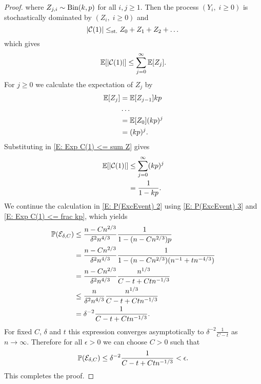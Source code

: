 \begin{proof}
	where $Z_{j,i} \sim\operatorname*{Bin}(k,p)$ for all $i,j \geq 1$.
	Then the process $(Y_i, \; i\geq 0)$ is stochastically dominated by 
	$(Z_i, \; i\geq 0)$ and
	\begin{equation}
	|\mathcal{C}(1)| \leq_{\text{st.}} Z_0 + Z_1 + Z_2 + \dots
	\end{equation}
	which gives
	\begin{equation} \label{E: Exp C(1) <= sum Z}
		\mathbb{E}[|\mathcal{C}(1)|] \leq \sum_{j=0}^{\infty}\mathbb{E}[Z_j].
	\end{equation}	
	For $j\geq0$ we calculate the expectation of $Z_j$ by
	\begin{equation}
	\begin{aligned}
	\mathbb{E}[Z_j] 
	&= \mathbb{E}[Z_{j-1}]kp \\
	&\dots \\
	&= \mathbb{E}[Z_0](kp)^j \\
	&= (kp)^j.
	\end{aligned}		
	\end{equation}
	Substituting in \eqref{E: Exp C(1) <= sum Z} gives
	\begin{equation} \label{E: Exp C(1) <= frac kp}
	\begin{aligned}
	\mathbb{E}[|\mathcal{C}(1)|] 
	&\leq \sum_{j=0}^{\infty} (kp)^j \\
	&= \frac{1}{1-kp}.
	\end{aligned}		
	\end{equation}
	We continue the calculation in \eqref{E: P(ExcEvent) 2} using \eqref{E: P(ExcEvent) 3} and \eqref{E: Exp C(1) <= frac kp},
	which yields
	\begin{equation}
	\begin{aligned}
	\mathbb{P}(\mathcal{E}_{\delta, C}) 
	&\leq \frac{n-Cn^{2 / 3}}{\delta^2 n^{4 / 3}} \frac{1}{1-(n-Cn^{2 / 3})p} \\
	&= \frac{n-Cn^{2 / 3}}{\delta^2 n^{4 / 3}} \frac{1}{1-(n-Cn^{2 / 3})(n^{-1} + tn^{-4 / 3})} \\
	&= \frac{n-Cn^{2 / 3}}{\delta^2 n^{4 / 3}} \frac{n^{1 / 3}}{C-t+Ctn^{-1 / 3}} \\
	&\leq \frac{n}{\delta^2 n^{4 / 3}} \frac{n^{1 / 3}}{C-t+Ctn^{-1 / 3}} \\
	&= \delta^{-2} \frac{1}{C-t+Ctn^{-1 / 3}}.
	\end{aligned}
	\end{equation}
	For fixed $C$, $\delta$ and $t$
	this expression converges asymptotically to $\delta^{-2} \frac{1}{C-t}$ as $n \rightarrow \infty$.
	Therefore for all $\epsilon>0$ we can choose $C>0$ such that
	\begin{equation}
		\mathbb{P}(\mathcal{E}_{\delta, C}) \leq \delta^{-2} \frac{1}{C-t+Ctn^{-1 / 3}} < \epsilon.
	\end{equation}
	This completes the proof.
\end{proof}

